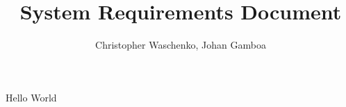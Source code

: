 \documentclass{article}
\title{System Requirements Document}
\author{Christopher Waschenko, Johan Gamboa}
\begin{document}
Hello World
\end{document}
